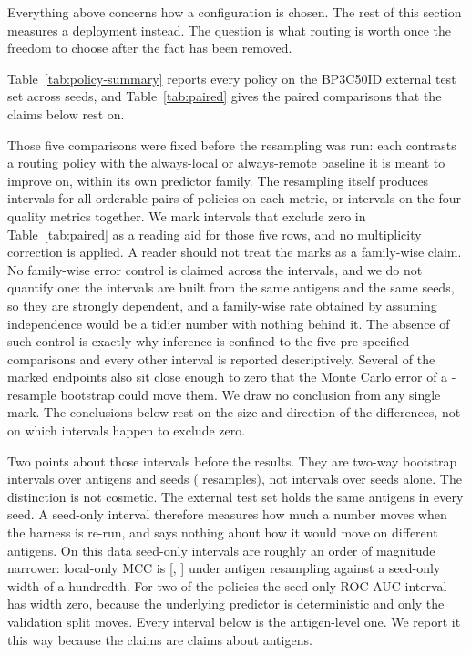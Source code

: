 Everything above concerns how a configuration is chosen. The rest of this
section measures a deployment instead. The question is what routing is worth
once the freedom to choose after the fact has been removed.

Table~\ref{tab:policy-summary} reports every policy on the BP3C50ID external
test set across \NumSeeds{} seeds, and Table~\ref{tab:paired} gives the paired
comparisons that the claims below rest on.

Those five comparisons were fixed before the resampling was run: each contrasts
a routing policy with the always-local or always-remote baseline it is meant to
improve on, within its own predictor family. The resampling itself produces
intervals for all \PolicyPairsComputed{} orderable pairs of policies on each
metric, or \QualityIntervalsComputed{} intervals on the four quality metrics
together. We mark intervals that exclude zero in Table~\ref{tab:paired} as a
reading aid for those five rows, and no multiplicity correction is applied. A
reader should not treat the marks as a family-wise claim. No family-wise
error control is claimed across the \QualityIntervalsComputed{} intervals, and
we do not quantify one: the intervals are built from the same antigens and the
same seeds, so they are strongly dependent, and a family-wise rate obtained by
assuming independence would be a tidier number with nothing behind it. The
absence of such control is exactly why inference is confined to the five
pre-specified comparisons and every other interval is reported descriptively.
Several of the marked endpoints also sit close enough to zero
that the Monte Carlo error of a \AntigenBootstrapRepeats{}-resample bootstrap
could move them. We draw no conclusion from any single mark. The
conclusions below rest on the size and direction of the differences, not on
which intervals happen to exclude zero.

Two points about those intervals before the results. They are two-way
bootstrap intervals over antigens and seeds
(\AntigenBootstrapRepeats{} resamples), not intervals over seeds alone. The
distinction is not cosmetic. The external test set holds the same
\AntigenCount{} antigens in every seed. A seed-only interval therefore measures
how much a number moves when the harness is re-run, and says nothing about how
it would move on different antigens. On this data seed-only intervals
are roughly an order of magnitude narrower: local-only MCC is
\ALocalOnlyMcc{} [\ALocalOnlyMccLo{}, \ALocalOnlyMccHi{}] under antigen
resampling against a seed-only width of a hundredth. For two of the
policies the seed-only ROC-AUC interval has width zero, because the underlying
predictor is deterministic and only the validation split moves. Every interval
below is the antigen-level one. We report it this way because the claims are
claims about antigens.


